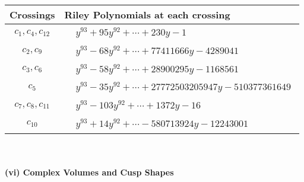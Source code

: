 \documentclass[1p]{elsarticle_modified}
\theoremstyle{definition}
\begin{document}
\begin{tabular}{m{50pt}|m{274pt}}
Crossings & \hspace{64pt}Riley Polynomials at each crossing \\
\hline $$\begin{aligned}c_{1},c_{4},c_{12}\end{aligned}$$&$\begin{aligned}
&y^{93}+95 y^{92}+\cdots+230 y-1
\end{aligned}$\\
\hline $$\begin{aligned}c_{2},c_{9}\end{aligned}$$&$\begin{aligned}
&y^{93}-68 y^{92}+\cdots+77411666 y-4289041
\end{aligned}$\\
\hline $$\begin{aligned}c_{3},c_{6}\end{aligned}$$&$\begin{aligned}
&y^{93}-58 y^{92}+\cdots+28900295 y-1168561
\end{aligned}$\\
\hline $$\begin{aligned}c_{5}\end{aligned}$$&$\begin{aligned}
&y^{93}-35 y^{92}+\cdots+27772503205947 y-510377361649
\end{aligned}$\\
\hline $$\begin{aligned}c_{7},c_{8},c_{11}\end{aligned}$$&$\begin{aligned}
&y^{93}-103 y^{92}+\cdots+1372 y-16
\end{aligned}$\\
\hline $$\begin{aligned}c_{10}\end{aligned}$$&$\begin{aligned}
&y^{93}+14 y^{92}+\cdots-580713924 y-12243001
\end{aligned}$\\
\hline
\end{tabular}\\~\\
\newpage\flushleft \textbf{(vi) Complex Volumes and Cusp Shapes}
\end{document}
